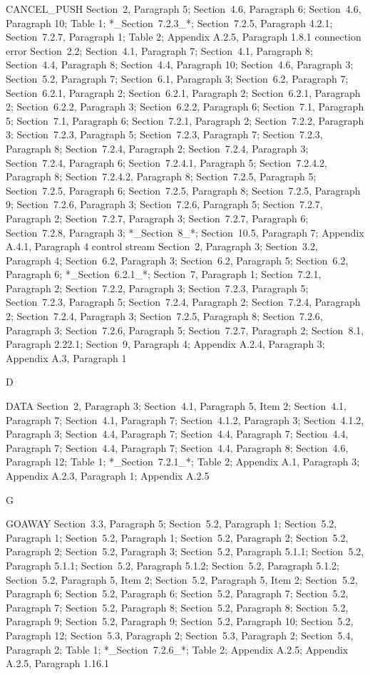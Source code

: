 \documentclass{article}
\begin{document}
CANCEL\_PUSH  Section~2, Paragraph 5; Section~4.6, Paragraph 6; Section~4.6, Paragraph 10; Table 1; *\_Section~7.2.3\_*; Section~7.2.5, Paragraph 4.2.1; Section~7.2.7, Paragraph 1; Table 2; Appendix A.2.5, Paragraph 1.8.1 connection error  Section~2.2; Section~4.1, Paragraph 7; Section~4.1, Paragraph 8; Section~4.4, Paragraph 8; Section~4.4, Paragraph 10; Section~4.6, Paragraph 3; Section~5.2, Paragraph 7; Section~6.1, Paragraph 3; Section~6.2, Paragraph 7; Section~6.2.1, Paragraph 2; Section~6.2.1, Paragraph 2; Section~6.2.1, Paragraph 2; Section~6.2.2, Paragraph 3; Section~6.2.2, Paragraph 6; Section~7.1, Paragraph 5; Section~7.1, Paragraph 6; Section~7.2.1, Paragraph 2; Section~7.2.2, Paragraph 3; Section~7.2.3, Paragraph 5; Section~7.2.3, Paragraph 7; Section~7.2.3, Paragraph 8; Section~7.2.4, Paragraph 2; Section~7.2.4, Paragraph 3; Section~7.2.4, Paragraph 6; Section~7.2.4.1, Paragraph 5; Section~7.2.4.2, Paragraph 8; Section~7.2.4.2, Paragraph 8; Section~7.2.5, Paragraph 5; Section~7.2.5, Paragraph 6; Section~7.2.5, Paragraph 8; Section~7.2.5, Paragraph 9; Section~7.2.6, Paragraph 3; Section~7.2.6, Paragraph 5; Section~7.2.7, Paragraph 2; Section~7.2.7, Paragraph 3; Section~7.2.7, Paragraph 6; Section~7.2.8, Paragraph 3; *\_Section~8\_*; Section~10.5, Paragraph 7; Appendix A.4.1, Paragraph 4 control stream  Section~2, Paragraph 3; Section~3.2, Paragraph 4; Section~6.2, Paragraph 3; Section~6.2, Paragraph 5; Section~6.2, Paragraph 6; *\_Section~6.2.1\_*; Section~7, Paragraph 1; Section~7.2.1, Paragraph 2; Section~7.2.2, Paragraph 3; Section~7.2.3, Paragraph 5; Section~7.2.3, Paragraph 5; Section~7.2.4, Paragraph 2; Section~7.2.4, Paragraph 2; Section~7.2.4, Paragraph 3; Section~7.2.5, Paragraph 8; Section~7.2.6, Paragraph 3; Section~7.2.6, Paragraph 5; Section~7.2.7, Paragraph 2; Section~8.1, Paragraph 2.22.1; Section~9, Paragraph 4; Appendix A.2.4, Paragraph 3; Appendix A.3, Paragraph 1

D

DATA  Section~2, Paragraph 3; Section~4.1, Paragraph 5, Item 2; Section~4.1, Paragraph 7; Section~4.1, Paragraph 7; Section~4.1.2, Paragraph 3; Section~4.1.2, Paragraph 3; Section~4.4, Paragraph 7; Section~4.4, Paragraph 7; Section~4.4, Paragraph 7; Section~4.4, Paragraph 7; Section~4.4, Paragraph 8; Section~4.6, Paragraph 12; Table 1; *\_Section~7.2.1\_*; Table 2; Appendix A.1, Paragraph 3; Appendix A.2.3, Paragraph 1; Appendix A.2.5

G

GOAWAY  Section~3.3, Paragraph 5; Section~5.2, Paragraph 1; Section~5.2, Paragraph 1; Section~5.2, Paragraph 1; Section~5.2, Paragraph 2; Section~5.2, Paragraph 2; Section~5.2, Paragraph 3; Section~5.2, Paragraph 5.1.1; Section~5.2, Paragraph 5.1.1; Section~5.2, Paragraph 5.1.2; Section~5.2, Paragraph 5.1.2; Section~5.2, Paragraph 5, Item 2; Section~5.2, Paragraph 5, Item 2; Section~5.2, Paragraph 6; Section~5.2, Paragraph 6; Section~5.2, Paragraph 7; Section~5.2, Paragraph 7; Section~5.2, Paragraph 8; Section~5.2, Paragraph 8; Section~5.2, Paragraph 9; Section~5.2, Paragraph 9; Section~5.2, Paragraph 10; Section~5.2, Paragraph 12; Section~5.3, Paragraph 2; Section~5.3, Paragraph 2; Section~5.4, Paragraph 2; Table 1; *\_Section~7.2.6\_*; Table 2; Appendix A.2.5; Appendix A.2.5, Paragraph 1.16.1
\end{document}
